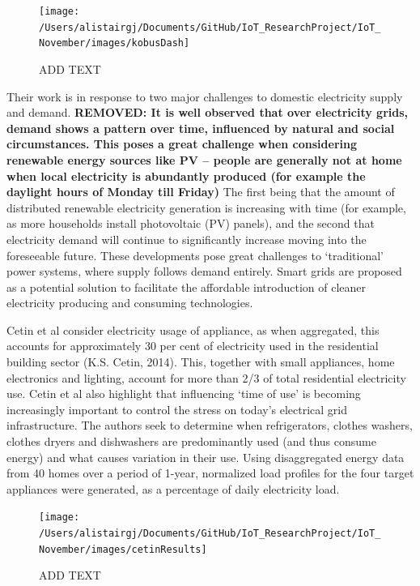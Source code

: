 \documentclass[11pt,]{article}
\begin{document}
\begin{figure}[H]

{\centering \texttt{[image: /Users/alistairgj/Documents/GitHub/IoT\_ResearchProject/IoT\_November/images/kobusDash]} 

}

\caption{ADD TEXT}\label{fig:unnamed-chunk-3}
\end{figure}

Their work is in response to two major challenges to domestic
electricity supply and demand. \textbf{REMOVED: It is well observed that
over electricity grids, demand shows a pattern over time, influenced by
natural and social circumstances. This poses a great challenge when
considering renewable energy sources like PV -- people are generally not
at home when local electricity is abundantly produced (for example the
daylight hours of Monday till Friday)} The first being that the amount
of distributed renewable electricity generation is increasing with time
(for example, as more households install photovoltaic (PV) panels), and
the second that electricity demand will continue to significantly
increase moving into the foreseeable future. These developments pose
great challenges to `traditional' power systems, where supply follows
demand entirely. Smart grids are proposed as a potential solution to
facilitate the affordable introduction of cleaner electricity producing
and consuming technologies.

Cetin et al consider electricity usage of appliance, as when aggregated,
this accounts for approximately 30 per cent of electricity used in the
residential building sector (K.S. Cetin, 2014). This, together with
small appliances, home electronics and lighting, account for more than
2/3 of total residential electricity use. Cetin et al also highlight
that influencing `time of use' is becoming increasingly important to
control the stress on today's electrical grid infrastructure. The
authors seek to determine when refrigerators, clothes washers, clothes
dryers and dishwashers are predominantly used (and thus consume energy)
and what causes variation in their use. Using disaggregated energy data
from 40 homes over a period of 1-year, normalized load profiles for the
four target appliances were generated, as a percentage of daily
electricity load.

\begin{figure}[H]

{\centering \texttt{[image: /Users/alistairgj/Documents/GitHub/IoT\_ResearchProject/IoT\_November/images/cetinResults]} 

}

\caption{ADD TEXT}\label{fig:unnamed-chunk-4}
\end{figure}
\end{document}
